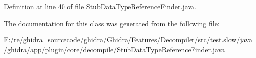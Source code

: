 Definition at line 40 of file Stub\+Data\+Type\+Reference\+Finder.\+java.



The documentation for this class was generated from the following file\+:\begin{DoxyCompactItemize}
\item 
F\+:/re/ghidra\+\_\+sourcecode/ghidra/\+Ghidra/\+Features/\+Decompiler/src/test.\+slow/java/ghidra/app/plugin/core/decompile/\mbox{\hyperlink{_stub_data_type_reference_finder_8java}{Stub\+Data\+Type\+Reference\+Finder.\+java}}\end{DoxyCompactItemize}
